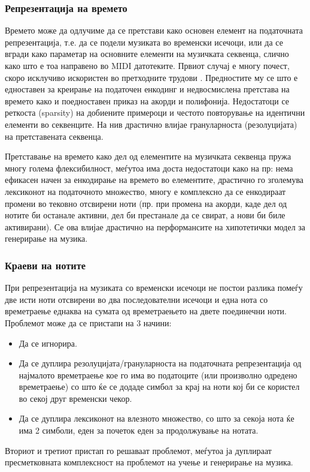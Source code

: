 \subsubsection{Репрезентација на времето}

Времето може да одлучиме да се претстави како основен елемент на податочната репрезентација, т.е. да се подели музиката во временски исечоци, или да се вгради како параметар на основните елементи на музичката секвенца, слично како што е тоа направено во MIDI датотеките. Првиот случај е многу почест, скоро исклучиво искористен во претходните трудови \cite{Hadjeres2016,Boulanger-Lewandowski2012,Boulanger-Lewandowski2014,Eck2002,Eck2008,Walder2016,Dong2017,Dong2018}. Предностите му се што е едноставен за креирање на податочен енкодинг и недвосмислена претстава на времето како и поедноставен приказ на акорди и полифонија. Недостатоци се реткоста (sparsity) на добиените примероци и честото повторување на идентични елементи во секвенците. На нив драстично влијае грануларноста (резолуцијата) на претставената секвенца. 

Претставање на времето како дел од елементите на музичката секвенца пружа многу голема флексибилност, меѓутоа има доста недостатоци како на пр: нема ефикасен начен за енкодирање на времето во елементите, драстично го зголемува лексиконот на податочното множество, многу е комплексно да се енкодираат промени во тековно отсвирени ноти (пр. при промена на акорди, каде дел од нотите би останале активни, дел би престанале да се свират, а нови би биле активирани). Се ова влијае драстично на перформансите на хипотетички модел за генерирање на музика.

\subsubsection{Краеви на нотите}

При репрезентација на музиката со временски исечоци не постои разлика помеѓу две исти ноти отсвирени во два последователни исечоци и една нота со времетраење еднаква на сумата од времетраењето на двете поединечни ноти. Проблемот може да се пристапи на 3 начини:
\begin{itemize}
    \item Да се игнорира.
    \item Да се дуплира резолуцијата/грануларноста на податочната репрезентација од најмалото времетраење кое го има во податоците (или произволно одредено времетраење) со што ќе се додаде симбол за крај на ноти кој би се користел во секој друг временски чекор.
    \item Да се дуплира лексиконот на влезното множество, со што за секоја нота ќе има 2 симболи, еден за почеток еден за продолжување на нотата.
\end{itemize}
Вториот и третиот пристап го решаваат проблемот, меѓутоа ја дуплираат пресметковната комплексност на проблемот на учење и генерирање на музика.

